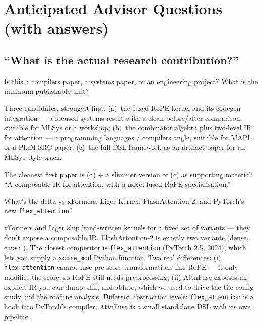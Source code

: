 \documentclass[11pt]{article}
\begin{document}
\section{Anticipated Advisor Questions (with answers)}

\subsection{``What is the actual research contribution?''}

\begin{question}{Is this a compilers paper, a systems paper, or an engineering
project? What is the minimum publishable unit?}
\end{question}
\begin{answer}
Three candidates, strongest first:
(a)~the fused RoPE kernel and its codegen integration --- a focused systems
result with a clean before/after comparison, suitable for MLSys or a
workshop;
(b)~the combinator algebra plus two-level IR for attention --- a programming
languages / compilers angle, suitable for MAPL or a PLDI SRC paper;
(c)~the full DSL framework as an artifact paper for an MLSys-style track.

The cleanest first paper is (a) + a slimmer version of (c) as supporting
material: ``A composable IR for attention, with a novel fused-RoPE
specialisation.''
\end{answer}

\begin{question}{What's the delta vs xFormers, Liger Kernel, FlashAttention-2,
and PyTorch's new \texttt{flex\_attention}?}
\end{question}
\begin{answer}
xFormers and Liger ship hand-written kernels for a fixed set of variants ---
they don't expose a composable IR. FlashAttention-2 is exactly two variants
(dense, causal). The closest competitor is \texttt{flex\_attention} (PyTorch
2.5, 2024), which lets you supply a \texttt{score\_mod} Python function. Two
real differences: (i) \texttt{flex\_attention} cannot fuse pre-score
transformations like RoPE --- it only modifies the score, so RoPE still
needs preprocessing; (ii) AttnFuse exposes an explicit IR you can dump,
diff, and ablate, which we used to drive the tile-config study and the
roofline analysis. Different abstraction levels: \texttt{flex\_attention}
is a hook into PyTorch's compiler; AttnFuse is a small standalone DSL with
its own pipeline.
\end{answer}
\end{document}
